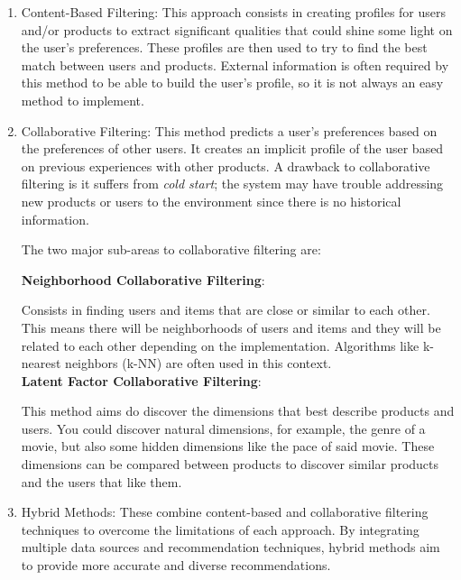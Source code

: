 \documentclass[10pt,twocolumn,letterpaper]{article}
\begin{document}
\begin{enumerate}

    \item Content-Based Filtering: This approach consists in creating profiles for users and/or products to extract significant qualities that could shine some light on the user's preferences. These profiles are then used to try to find the best match between users and products. External information is often required by this method to be able to build the user's profile, so it is not always an easy method to implement.

    \item Collaborative Filtering: This method predicts a user's preferences based on the preferences of other users. It creates an implicit profile of the user based on previous experiences with other products. A drawback to collaborative filtering is it suffers from \textit{cold start}; the system may have trouble addressing new products or users to the environment since there is no historical information.
    
    The two major sub-areas to collaborative filtering are:

        \textbf{Neighborhood Collaborative Filtering}:
        
        Consists in finding users and items that are close or similar to each other. This means there will be neighborhoods of users and items and they will be related to each other depending on the implementation. Algorithms like k-nearest neighbors (k-NN) are often used in this context. \\


        \textbf{Latent Factor Collaborative Filtering}:
        
        This method aims do discover the dimensions that best describe products and users. You could discover natural dimensions, for example, the genre of a movie, but also some hidden dimensions like the pace of said movie. These dimensions can be compared between products to discover similar products and the users that like them.
        

    \item Hybrid Methods: These combine content-based and collaborative filtering techniques to overcome the limitations of each approach. By integrating multiple data sources and recommendation techniques, hybrid methods aim to provide more accurate and diverse recommendations.
    
\end{enumerate}
\end{document}
